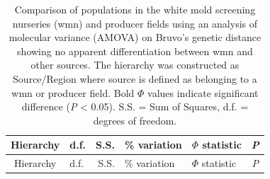\begin{longtable}[]{@{}clrllc@{}}
\caption{\label{tab:amova} Comparison of populations in the white mold
screening nurseries (wmn) and producer fields using an analysis of
molecular variance (AMOVA) on Bruvo's genetic distance showing no
apparent differentiation between wmn and other sources. The hierarchy
was constructed as Source/Region where source is defined as belonging to
a wmn or producer field. Bold \(\Phi\) values indicate significant
difference (\emph{P} \textless{} 0.05). S.S. = Sum of Squares, d.f. =
degrees of freedom.}\tabularnewline
\toprule
\begin{minipage}[b]{0.32\columnwidth}\centering\strut
Hierarchy\strut
\end{minipage} & \begin{minipage}[b]{0.06\columnwidth}\raggedright\strut
d.f.\strut
\end{minipage} & \begin{minipage}[b]{0.07\columnwidth}\raggedleft\strut
S.S.\strut
\end{minipage} & \begin{minipage}[b]{0.13\columnwidth}\raggedright\strut
\% variation\strut
\end{minipage} & \begin{minipage}[b]{0.19\columnwidth}\raggedright\strut
\(\Phi\) statistic\strut
\end{minipage} & \begin{minipage}[b]{0.07\columnwidth}\centering\strut
\emph{P}\strut
\end{minipage}\tabularnewline
\midrule
\endfirsthead
\toprule
\begin{minipage}[b]{0.32\columnwidth}\centering\strut
Hierarchy\strut
\end{minipage} & \begin{minipage}[b]{0.06\columnwidth}\raggedright\strut
d.f.\strut
\end{minipage} & \begin{minipage}[b]{0.07\columnwidth}\raggedleft\strut
S.S.\strut
\end{minipage} & \begin{minipage}[b]{0.13\columnwidth}\raggedright\strut
\% variation\strut
\end{minipage} & \begin{minipage}[b]{0.19\columnwidth}\raggedright\strut
\(\Phi\) statistic\strut
\end{minipage} & \begin{minipage}[b]{0.07\columnwidth}\centering\strut
\emph{P}\strut

\end{minipage}
\end{longtable}
